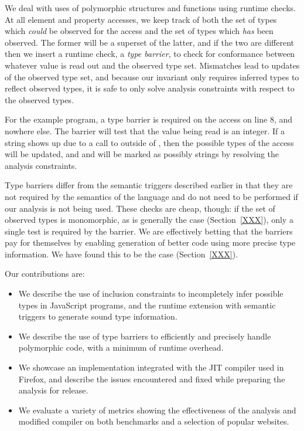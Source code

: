 We deal with uses of polymorphic structures and functions using runtime checks.
At all element and property accesses, we keep track of both the set of
types which \emph{could} be observed for the access and the set of types
which \emph{has} been observed.
The former will be a superset of the latter, and if the two are different then
we insert a runtime check, a {\it type barrier}, to check for conformance
between whatever value is read out and the observed type set.
Mismatches lead to updates of the observed type set, and because our
invariant only requires inferred types to reflect observed types, it is
safe to only solve analysis constraints with respect to the observed types.

For the example program, a type barrier is required on the  access
on line 8, and nowhere else. The barrier will test that the value being read
is an integer. If a string shows up due to a call to 
outside of , then the possible types of the  access
will be updated, and  and  will be marked as possibly
strings by resolving the analysis constraints.

Type barriers differ from the semantic triggers described earlier in that
they are not required by the semantics of the language and do not need to
be performed if our analysis is not being used.
These checks are cheap, though: if the set of observed types is monomorphic,
as is generally the case (Section~\ref{XXX}), only a single test is required
by the barrier.
We are effectively betting that the barriers
pay for themselves by enabling generation of better code using more precise type information.
We have found this to be the case (Section~\ref{XXX}).

Our contributions are:

\begin{itemize}

\item We describe the use of inclusion constraints to incompletely infer
possible types in JavaScript programs, and the runtime extension with semantic
triggers to generate sound type information.

\item We describe the use of type barriers to efficiently and precisely handle
polymorphic code, with a minimum of runtime overhead.

\item We showcase an implementation integrated with the JIT compiler used in
Firefox, and describe the issues encountered and fixed while preparing
the analysis for release.

\item We evaluate a variety of metrics showing the effectiveness of the analysis
and modified compiler on both benchmarks and a selection of popular websites.

\end{itemize}


